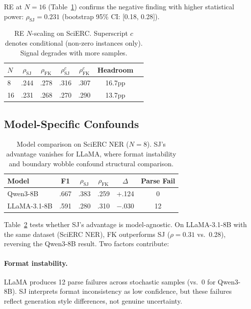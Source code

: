 \documentclass[11pt,a4paper]{article}
\begin{document}
RE at $N{=}16$ (Table~\ref{tab:re_n16}) confirms the negative finding with higher statistical power: $\rho_{\text{SJ}}{=}0.231$ (bootstrap 95\% CI: [0.18, 0.28]).

\begin{table}[t]
\centering
\small
\begin{tabular}{lcccccc}
\toprule
$N$ & $\rho_{\text{SJ}}$ & $\rho_{\text{FK}}$ & $\rho_{\text{SJ}}^{c}$ & $\rho_{\text{FK}}^{c}$ & Headroom \\
\midrule
8 & .244 & .278 & .316 & .307 & 16.7pp \\
16 & .231 & .268 & .270 & .290 & 13.7pp \\
\bottomrule
\end{tabular}
\caption{RE $N$-scaling on SciERC. Superscript $c$ denotes conditional (non-zero instances only). Signal degrades with more samples.}
\label{tab:re_n16}
\end{table}

\subsection{Model-Specific Confounds}

\begin{table}[t]
\centering
\small
\begin{tabular}{lccccc}
\toprule
\textbf{Model} & \textbf{F1} & $\rho_{\text{SJ}}$ & $\rho_{\text{FK}}$ & $\Delta$ & \textbf{Parse Fail} \\
\midrule
Qwen3-8B & .667 & .383 & .259 & +.124 & 0 \\
LLaMA-3.1-8B & .591 & .280 & .310 & $-$.030 & 12 \\
\bottomrule
\end{tabular}
\caption{Model comparison on SciERC NER ($N{=}8$). SJ's advantage vanishes for LLaMA, where format instability and boundary wobble confound structural comparison.}
\label{tab:multimodel}
\end{table}

Table~\ref{tab:multimodel} tests whether SJ's advantage is model-agnostic.
On LLaMA-3.1-8B with the same dataset (SciERC NER), FK outperforms SJ ($\rho{=}0.31$ vs.\ 0.28), reversing the Qwen3-8B result.
Two factors contribute:

\paragraph{Format instability.}
LLaMA produces 12 parse failures across stochastic samples (vs.\ 0 for Qwen3-8B).
SJ interprets format inconsistency as low confidence, but these failures reflect generation style differences, not genuine uncertainty.
\end{document}
